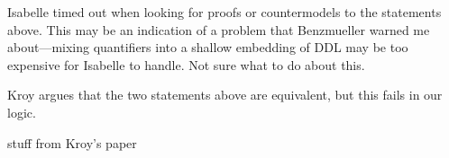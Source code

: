 \begin{isabellebody}
\begin{isamarkuptext}
Isabelle timed out when looking for proofs or countermodels to the statements above. This may be 
        an indication of a problem that Benzmueller warned me about—mixing quantifiers into a shallow
        embedding of DDL may be too expensive for Isabelle to handle. Not sure what to do about this.%
\end{isamarkuptext}\isamarkuptrue%
%
\isadelimproof
%
\endisadelimproof
%
\isatagproof
%
\endisatagproof
{\isafoldproof}%
%
\isadelimproof
%
\endisadelimproof
%
\begin{isamarkuptext}%
Kroy argues that the two statements above are equivalent, but this fails in our logic.%
\end{isamarkuptext}\isamarkuptrue%
%
\begin{isamarkuptext}%
stuff from Kroy's paper%
\end{isamarkuptext}\isamarkuptrue%
%
\isadelimproof
%
\endisadelimproof
%
\isatagproof
%
\endisatagproof
{\isafoldproof}%
%
\isadelimproof
%
\endisadelimproof
%
\isadelimproof
%
\endisadelimproof
%
\isatagproof
%
\endisatagproof
{\isafoldproof}%
%
\isadelimproof
%
\endisadelimproof
%
\isadelimproof
%
\endisadelimproof
%
\isatagproof
%
\endisatagproof
{\isafoldproof}%
%
\isadelimproof
%
\endisadelimproof
%
\isadelimproof
%
\endisadelimproof
%
\isatagproof
%
\endisatagproof
{\isafoldproof}%
%
\isadelimproof
%
\endisadelimproof
%
\isadelimproof
%
\endisadelimproof
%
\isatagproof
%
\endisatagproof
{\isafoldproof}%
%
\isadelimproof
%
\endisadelimproof
%
\isadelimproof
%
\endisadelimproof
%
\isatagproof
%
\endisatagproof
{\isafoldproof}%
%
\isadelimproof
%
\endisadelimproof
%
\isadelimtheory
%
\endisadelimtheory
%
\isatagtheory
%
\endisatagtheory
{\isafoldtheory}%
%
\isadelimtheory
%
\endisadelimtheory
%
\end{isabellebody}%
\endinput
